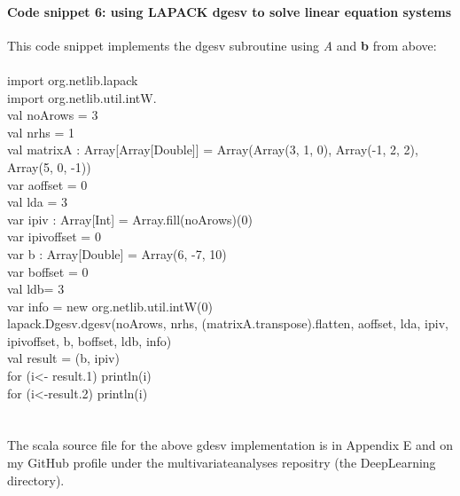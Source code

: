 \documentclass {article}
\begin{document}
\paragraph{Code snippet 6: using LAPACK dgesv to solve linear equation systems}
This code snippet implements the dgesv subroutine using \textit{A} and \textbf{b} from above:
\\
\\ 
import org.netlib.lapack\\
import org.netlib.util.intW.\underline{\space}\\
val noArows = 3\\
val nrhs = 1\\
val matrixA : Array[Array[Double]] = Array(Array(3, 1, 0), Array(-1, 2, 2), Array(5, 0, -1))\\
var aoffset = 0\\
val lda = 3\\
var ipiv : Array[Int] = Array.fill(noArows)(0)\\
var ipivoffset = 0\\
var b  : Array[Double] = Array(6, -7, 10)\\
var boffset = 0\\
val ldb= 3\\
var info = new org.netlib.util.intW(0)\\
lapack.Dgesv.dgesv(noArows, nrhs, (matrixA.transpose).flatten, aoffset, lda, ipiv, ipivoffset, b, boffset, ldb, info)\\
val result = (b, ipiv)\\
for (i<- result.\underline{\space}1) println(i)\\
for (i<-result.\underline{\space}2) println(i)\\
\\
\\
The scala source file for the above gdesv implementation is in Appendix E and on my GitHub profile under the multivariate\underline{\space}analyses repositry (the DeepLearning directory).
\end{document}
